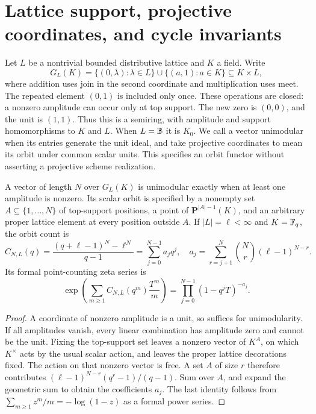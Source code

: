 \section{Lattice support, projective coordinates, and cycle invariants}
\label{sec:lattice-coordinate-geometry}
Let $L$ be a nontrivial bounded distributive lattice and $K$ a field. Write
\[
 G_L(K)=\{(0,\lambda):\lambda\in L\}\cup\{(a,1):a\in K\}
 \subseteq K\times L,
\]
where addition uses join in the second coordinate and multiplication uses
meet. The repeated element $(0,1)$ is included only once. These operations
are closed: a nonzero amplitude can occur only at top support. The new
zero is $(0,0)$, and the unit is $(1,1)$. Thus this is a semiring, with
amplitude and support homomorphisms to $K$ and $L$. When $L=\mathbb B$ it is
$K_0$. We call a vector unimodular when its entries generate the unit ideal,
and take projective coordinates to mean its orbit under common scalar
units. This specifies an orbit functor without asserting a projective
scheme realization.

\begin{proposition}\label{prop:lattice-profiles}
A vector of length $N$ over $G_L(K)$ is unimodular exactly when at least
one amplitude is nonzero. Its scalar orbit is specified by a nonempty
set $A\subseteq\{1,\ldots,N\}$ of top-support positions, a point of
$\mathbf P^{|A|-1}(K)$, and an arbitrary proper lattice element at every
position outside $A$. If $|L|=\ell<\infty$ and $K=\mathbb F_q$, the orbit count is
\[
 C_{N,L}(q)=\frac{(q+\ell-1)^N-\ell^N}{q-1}
 =\sum_{j=0}^{N-1}a_jq^j,
 \quad
 a_j=\sum_{r=j+1}^{N}\binom Nr(\ell-1)^{N-r}.
\]
Its formal point-counting zeta series is
\[
 \exp\!\left(\sum_{m\ge1}C_{N,L}(q^m)\frac{T^m}{m}\right)
 =\prod_{j=0}^{N-1}(1-q^jT)^{-a_j}.
\]
\end{proposition}
\begin{proof}
A coordinate of nonzero amplitude is a unit, so suffices for unimodularity.
If all amplitudes vanish, every linear combination has amplitude zero
and cannot be the unit. Fixing the top-support set leaves a nonzero vector
of $K^A$, on which $K^\times$ acts by the usual scalar action, and leaves
the proper lattice decorations fixed. The action on that nonzero vector
is free. A set $A$ of size $r$ therefore contributes
$(\ell-1)^{N-r}(q^r-1)/(q-1)$. Sum over $A$, and expand the geometric
sum to obtain the coefficients $a_j$. The last identity follows from
$\sum_{m\ge1}z^m/m=-\log(1-z)$ as a formal power series.
\end{proof}

